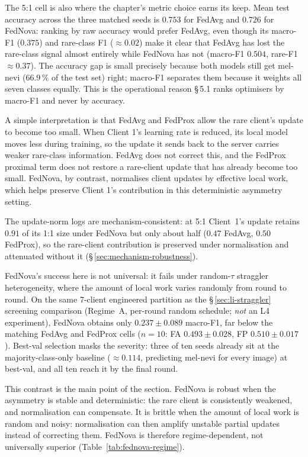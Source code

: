 \documentclass[11pt,a4paper]{report}
\begin{document}
The 5:1 cell is also where the chapter's metric choice earns its keep. Mean
test accuracy across the three matched seeds is $0.753$ for FedAvg and
$0.726$ for FedNova: ranking by raw accuracy would prefer FedAvg, even
though its macro-F1 ($0.375$) and rare-class F1 ($\approx 0.02$) make it
clear that FedAvg has lost the rare-class signal almost entirely while
FedNova has not (macro-F1 $0.504$, rare-F1 $\approx 0.37$). The accuracy
gap is small precisely because both models still get mel-nevi
($66.9\,\%$ of the test set) right; macro-F1 separates them because it
weights all seven classes equally. This is the operational reason \S\,5.1
ranks optimisers by macro-F1 and never by accuracy.

A simple interpretation is that FedAvg and FedProx allow the rare client's
update to become too small. When Client 1's learning rate is reduced, its
local model moves less during training, so the update it sends back to the
server carries weaker rare-class information. FedAvg does not correct this,
and the FedProx proximal term does not restore a rare-client update that has
already become too small. FedNova, by contrast, normalises client updates by
effective local work, which helps preserve Client 1's contribution in this
deterministic asymmetry setting.

The update-norm logs are mechanism-consistent: at 5:1 Client~1's update retains
$0.91$ of its 1:1 size under FedNova but only about half ($0.47$ FedAvg, $0.50$
FedProx), so the rare-client contribution is preserved under normalisation and
attenuated without it (\S\,\ref{sec:mechanism-robustness}).

FedNova's success here is not universal: it fails under random-$\tau$ straggler
heterogeneity, where the amount of local work varies randomly from round to
round. On the same 7-client engineered partition as the
\S\,\ref{sec:li-straggler} screening comparison (Regime~A, per-round random
schedule; \emph{not} an L4 experiment), FedNova obtains only
$0.237 \pm 0.089$ macro-F1, far below the matching FedAvg and FedProx cells
($n = 10$: FA $0.493 \pm 0.028$, FP $0.510 \pm 0.017$). Best-val selection masks
the severity: three of ten seeds already sit at the majority-class-only baseline
($\approx 0.114$, predicting mel-nevi for every image) at best-val, and all ten
reach it by the final round.

This contrast is the main point of the section. FedNova is robust when the
asymmetry is stable and deterministic: the rare client is consistently
weakened, and normalisation can compensate. It is brittle when the amount of
local work is random and noisy: normalisation can then amplify unstable
partial updates instead of correcting them. FedNova is therefore
regime-dependent, not universally superior
(Table~\ref{tab:fednova-regime}).
\end{document}

